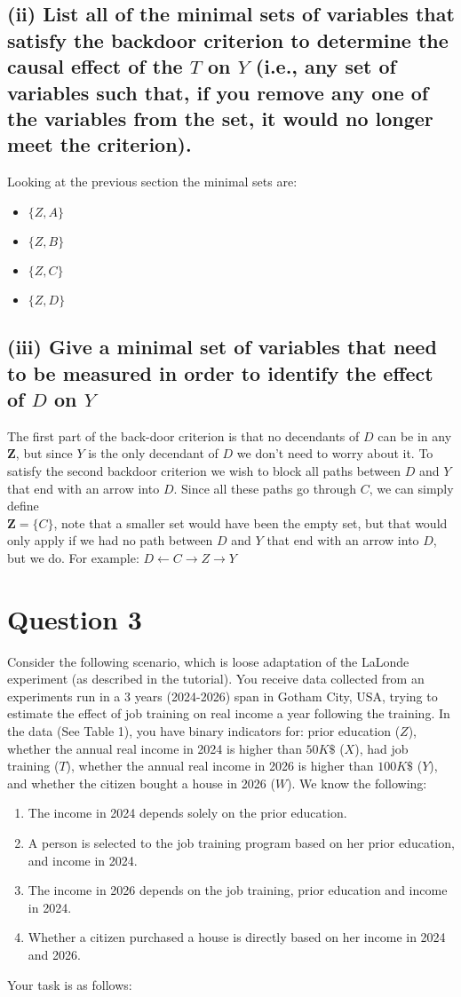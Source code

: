 \documentclass{article}
\begin{document}
\subsection*{(ii) List all of the minimal sets of variables that satisfy the backdoor criterion to determine the causal effect of the $T$ on $Y$ (i.e., any set of variables such that, if you remove any one of the variables from the set, it would no longer meet the criterion).}
Looking at the previous section the minimal sets are: 
\begin{itemize}
    \item $\{Z, A\}$
    \item $\{Z, B\}$
    \item $\{Z, C\}$
    \item $\{Z, D\}$
\end{itemize} 

\subsection*{(iii) Give a minimal set of variables that need to be measured in order to identify the effect of $D$ on $Y$}
The first part of the back-door criterion is that no decendants of $D$ can be in any $\mathbf{Z}$, but since $Y$ is the only decendant of $D$ we don't need to worry about it.
To satisfy the second backdoor criterion we wish to block all paths between $D$ and $Y$ that end with an arrow into $D$. Since all these paths go through $C$, we can simply define \\
$\mathbf{Z}=\{C\}$, note that a smaller set would have been the empty set, but that would only apply if we had no path between $D$ and $Y$ that end with an arrow into $D$, but we do. For example: $D\leftarrow{}C\rightarrow{}Z\rightarrow{}Y$

\newpage
\section*{Question 3}
Consider the following scenario, which is loose adaptation of the LaLonde experiment (as described in the tutorial). You receive data collected from an experiments run in a 3 years (2024-2026) span in Gotham City, USA, trying to estimate the effect of job training on real income a year following the training. In the data (See Table 1), you have binary indicators for: prior education ($Z$), whether the annual real income in 2024 is higher than $50K\$$ ($X$), had job training ($T$), whether the annual real income in 2026 is higher than $100K\$$ ($Y$), and whether the citizen bought a house in 2026 ($W$). We know the following:
\begin{enumerate}
    \item The income in 2024 depends solely on the prior education.
    \item A person is selected to the job training program based on her prior education, and income in 2024. 
    \item The income in 2026 depends on the job training, prior education and income in 2024.
    \item Whether a citizen purchased a house is directly based on her income in 2024 and 2026.
\end{enumerate}
Your task is as follows:
\end{document}

